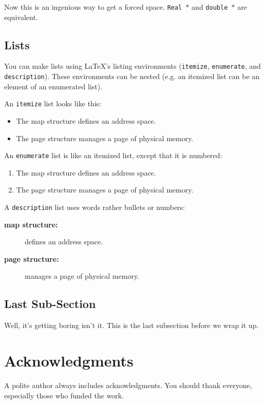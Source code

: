 \documentclass[XXX,endnotes]{usetex-v1}
\begin{document}
Now this is an ingenious way to get a forced space.  \texttt{Real~$*$}
and \texttt{double~$*$} are equivalent.


\subsection{Lists}

You can make lists using LaTeX's listing environments
(\texttt{itemize}, \texttt{enumerate}, and \texttt{description}).
These environments can be nested (e.g. an itemized list can be an
element of an enumerated list).

An \texttt{itemize} list looks like this:
\begin{itemize}
\item The map structure defines an address space.
\item The page structure manages a page of physical memory.
\end{itemize}

An \texttt{enumerate} list is like an itemized list, except that it is
numbered:
\begin{enumerate}
\item The map structure defines an address space.
\item The page structure manages a page of physical memory.
\end{enumerate}

A \texttt{description} list uses words rather bullets or numbers:
\begin{description}
\item[\textbf{map structure:}] defines an address space.
\item[\textbf{page structure:}] manages a page of physical memory.
\end{description}

\subsection{Last Sub-Section}

Well, it's getting boring isn't it.  This is the last subsection
before we wrap it up.

\section{Acknowledgments}

A polite author always includes acknowledgments.  You
should thank everyone,
especially those who funded the work.
\end{document}

